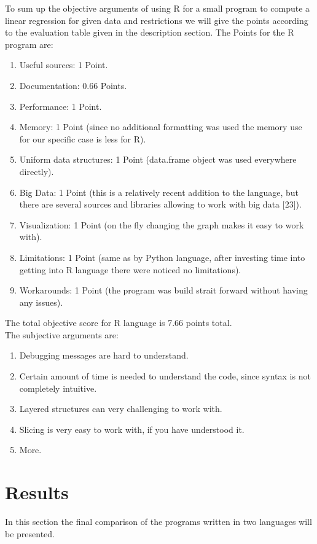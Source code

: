 \documentclass{article}
\begin{document}
To sum up the objective arguments of using R for a small program to compute a linear regression for given data and restrictions we will give the points according to the evaluation table given in the description section. The Points for the R program are:
\begin{enumerate}
    \item Useful sources: 1 Point.
    \item Documentation: 0.66 Points.
    \item Performance: 1 Point.
    \item Memory: 1 Point (since no additional formatting was used the memory use for our specific case is less for R).
    \item Uniform data structures: 1 Point (data.frame object was used everywhere directly).
    \item Big Data: 1 Point (this is a relatively recent addition to the language, but there are several sources and libraries allowing to work with big data [23]).
    \item Visualization: 1 Point (on the fly changing the graph makes it easy to work with).
    \item Limitations: 1 Point (same as by Python language, after investing time into getting into R language there were noticed no limitations).
    \item Workarounds: 1 Point (the program was build strait forward without having any issues).
\end{enumerate} 
The total objective score for R language is 7.66 points total.\\
The subjective arguments are:
\begin{enumerate}
    \item Debugging messages are hard to understand.
    \item Certain amount of time is needed to understand the code, since syntax is not completely intuitive.
    \item Layered structures can very challenging to work with.
    \item Slicing is very easy to work with, if you have understood it.
    \item More.
\end{enumerate}

\newpage
\section{Results}
In this section the final comparison of the programs written in two languages will be presented.
\end{document}
